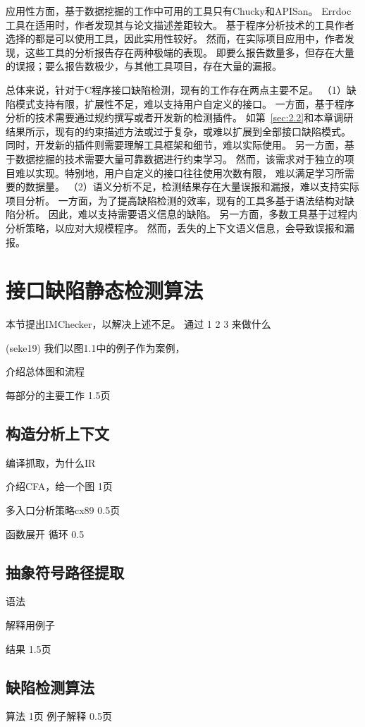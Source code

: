 应用性方面，基于数据挖掘的工作中可用的工具只有Chucky和APISan。
Errdoc工具在适用时，作者发现其与论文描述差距较大。
基于程序分析技术的工具作者选择的都是可以使用工具，因此实用性较好。
然而，在实际项目应用中，作者发现，这些工具的分析报告存在两种极端的表现。
即要么报告数量多，但存在大量的误报；要么报告数极少，与其他工具项目，存在大量的漏报。

总体来说，针对于C程序接口缺陷检测，现有的工作存在两点主要不足。
（1）缺陷模式支持有限，扩展性不足，难以支持用户自定义的接口。
一方面，基于程序分析的技术需要通过规约撰写或者开发新的检测插件。
如第~\ref{sec:2.2}和本章调研结果所示，现有的约束描述方法或过于复杂，或难以扩展到全部接口缺陷模式。
同时，开发新的插件则需要理解工具框架和细节，难以实际使用。
另一方面，基于数据挖掘的技术需要大量可靠数据进行约束学习。
然而，该需求对于独立的项目难以实现。特别地，用户自定义的接口往往使用次数有限，
难以满足学习所需要的数据量。
（2）语义分析不足，检测结果存在大量误报和漏报，难以支持实际项目分析。
一方面，为了提高缺陷检测的效率，现有的工具多基于语法结构对缺陷分析。
因此，难以支持需要语义信息的缺陷。
另一方面，多数工具基于过程内分析策略，以应对大规模程序。
然而，丢失的上下文语义信息，会导致误报和漏报。

\section{接口缺陷静态检测算法}
\label{sec:3.3}
本节提出IMChecker，以解决上述不足。
通过 1 2 3 来做什么


(seke19)
我们以图1.1中的例子作为案例，

介绍总体图和流程

每部分的主要工作
1.5页

\subsection{构造分析上下文}
编译抓取，为什么IR

介绍CFA，给一个图
1页

多入口分析策略cx89
0.5页

函数展开
循环
0.5

\subsection{抽象符号路径提取}
语法

解释用例子

结果
1.5页
\subsection{缺陷检测算法}
算法
1页
例子解释
0.5页

